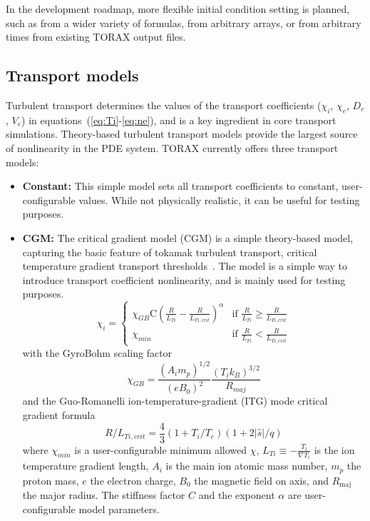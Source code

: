 \documentclass[aps, reprint, nofootinbib]{revtex4-2}
\begin{document}
In the development roadmap, more flexible initial condition setting is planned, such as from a wider variety of formulas, from arbitrary arrays, or from arbitrary times from existing TORAX output files.

\subsection{Transport models}
Turbulent transport determines the values of the transport coefficients ($\chi_i$, $\chi_e$, $D_e$, $V_e$) in equations~(\ref{eq:Ti}-\ref{eq:ne}), and is a key ingredient in core transport simulations. Theory-based turbulent transport models provide the largest source of nonlinearity in the PDE system. TORAX currently offers three transport models:
\begin{itemize}
\item \textbf{Constant:} This simple model sets all transport coefficients to constant, user-configurable values. While not physically realistic, it can be useful for testing purposes.
\item \textbf{CGM:} The critical gradient model (CGM) is a simple theory-based model, capturing the basic feature of tokamak turbulent transport, critical temperature gradient transport thresholds~\cite{garbet:2004}. The model is a simple way to introduce transport coefficient nonlinearity, and is mainly used for testing purposes. \begin{equation}
\chi_i = \begin{cases}
\chi_{GB} \text{C} (\frac{R}{L_{Ti}} - \frac{R}{L_{Ti,\textit{crit}}})^{\alpha} & \text{if } \frac{R}{L_{Ti}} \ge \frac{R}{L_{Ti,\textit{crit}}} \\
\chi_{min}  & \text{if } \frac{R}{L_{Ti}} < \frac{R}{L_{Ti,\textit{crit}}}
\end{cases}
\end{equation}
with the GyroBohm scaling factor
\begin{equation}
\chi_{GB} = \frac{(A_i m_p)^{1/2}}{(eB_0)^2}\frac{(T_i k_B)^{3/2}}{R_\textit{maj}}
\end{equation}
and the Guo-Romanelli ion-temperature-gradient (ITG) mode critical gradient formula~\cite{guo:1993}
\begin{equation}
R/L_{Ti,crit} = \frac{4}{3}(1 + T_i/T_e)(1 + 2|\hat{s}|/q)
\end{equation}
where $\chi_\textit{min}$ is a user-configurable minimum allowed $\chi$, $L_{Ti}\equiv-\frac{T_i}{\nabla T_i}$ is the ion temperature gradient length, $A_i$ is the main ion atomic mass number, $m_p$ the proton mass, $e$ the electron charge, $B_0$ the magnetic field on axis, and $R_\mathrm{maj}$ the major radius. The stiffness factor $C$ and the exponent $\alpha$ are user-configurable model parameters.


\end{itemize}
\end{document}

